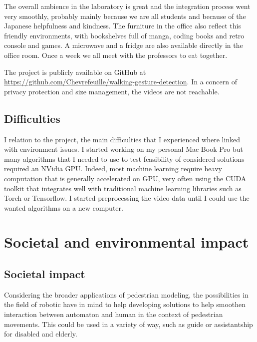 \documentclass[12pt,a4paper,twoside]{article}
\begin{document}
The overall ambience in the laboratory is great and the integration process went very smoothly, probably mainly because we are all students and because of the Japanese helpfulness and kindness. The furniture in the office also reflect this friendly environments, with bookshelves full of manga, coding books and retro console and games. A microwave and a fridge are also available directly in the office room. Once a week we all meet with the professors to eat together.

The project is publicly available on GitHub at \url{https://github.com/Chevrefeuille/walking-gesture-detection}. In a concern of privacy protection and size management, the videos are not reachable.

\subsection{Difficulties}
I relation to the project, the main difficulties that I experienced where linked with environment issues. I started working on my personal Mac Book Pro but many algorithms that I needed to use to test feasibility of considered solutions required an NVidia GPU. Indeed, most machine learning require heavy computation that is generally accelerated on GPU, very often using the CUDA toolkit that integrates well with traditional machine learning libraries such as Torch or Tensorflow. I started preprocessing the video data until I could use the wanted algorithms on a new computer.


\section{Societal and environmental impact}

\subsection{Societal impact}
Considering the broader applications of pedestrian modeling, the possibilities in the field of robotic have in mind to help developing solutions to help smoothen interaction between automaton and human in the context of pedestrian movements. This could be used in a variety of way, such as guide or assistantship for disabled and elderly. 
\end{document}
